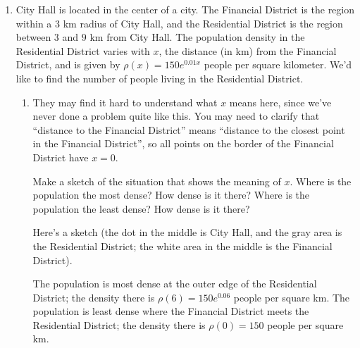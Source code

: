 \documentclass{article}
\begin{document}
\begin{enumerate}

\item
 
  City Hall is located in the center of a city. The Financial District is the region within a $3$ km radius of City Hall, and the Residential District is the
  region between $3$ and $9$ km from City Hall.  The population density in
  the Residential District varies with $x$, the distance (in km) from the
  Financial District, and is given by $\rho(x) = 150 e^{ 0.01x}$ people
  per square kilometer.  We'd like to find the number of people living in
  the Residential District.

  \begin {enumerate}

  \item
    \begin{workshop}
      They may find it hard to understand what $x$ means here, since we've
      never done a problem quite like this.  You may need to clarify that
      ``distance to the Financial District'' means ``distance to the
      closest point in the Financial District'', so all points on the
      border of the Financial District have $x = 0$. 
    \end{workshop}

    \begin{problem}
       Make a sketch of the situation
      that shows the meaning of $x$.  Where is the population the most
      dense?  How dense is it there?  Where is the population the least
      dense?  How dense is it there? 
    \end{problem}

    \begin{solution}
      Here's a sketch (the dot in the middle is City Hall, and the gray
      area is the Residential District; the white area in the middle is the
      Financial District).  
      \begin{center}
      \end{center}
      The population is most dense at the outer edge of the Residential
      District; the density there is $\rho(6) = 150 e^{0.06}$ people per
      square km.  The population is least dense where the Financial
      District meets the Residential District; the density there is $\rho(0) =
      150$ people per square km.
    \end{solution}
\pspace{\vfill}


\end{enumerate}
\end{enumerate}
\end{document}
